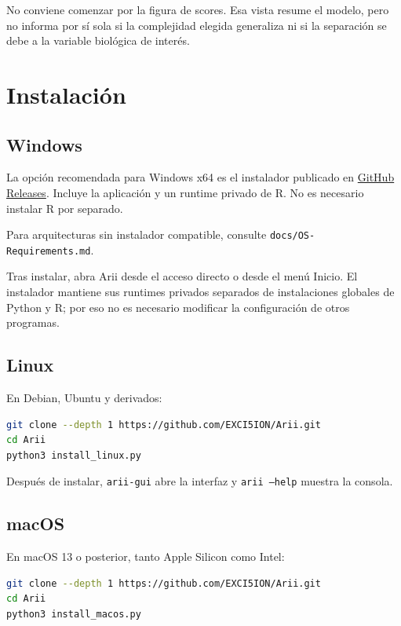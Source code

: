 \documentclass[11pt,a4paper,openany]{report}
\newcommand{\code}[1]{\texttt{#1}}
\begin{document}
No conviene comenzar por la figura de scores. Esa vista resume el modelo, pero
no informa por sí sola si la complejidad elegida generaliza ni si la separación
se debe a la variable biológica de interés.

\chapter{Instalación}

\section{Windows}

La opción recomendada para Windows x64 es el instalador publicado en
\href{https://github.com/EXCI5ION/Arii/releases/latest}{GitHub Releases}. Incluye
la aplicación y un runtime privado de R. No es necesario instalar R por separado.

Para arquitecturas sin instalador compatible, consulte \code{docs/OS-Requirements.md}.

Tras instalar, abra Arii desde el acceso directo o desde el menú Inicio. El
instalador mantiene sus runtimes privados separados de instalaciones globales
de Python y R; por eso no es necesario modificar la configuración de otros programas.

\section{Linux}

En Debian, Ubuntu y derivados:

\begin{lstlisting}[language=bash]
git clone --depth 1 https://github.com/EXCI5ION/Arii.git
cd Arii
python3 install_linux.py
\end{lstlisting}

Después de instalar, \code{arii-gui} abre la interfaz y \code{arii --help}
muestra la consola.

\section{macOS}

En macOS 13 o posterior, tanto Apple Silicon como Intel:

\begin{lstlisting}[language=bash]
git clone --depth 1 https://github.com/EXCI5ION/Arii.git
cd Arii
python3 install_macos.py
\end{lstlisting}
\end{document}
